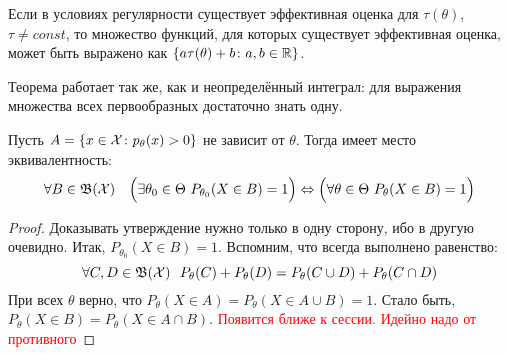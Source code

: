 \begin{theorem}
	Если в условиях регулярности существует эффективная оценка для $\tau(\theta)$, $\tau \neq const$, то множество функций, для которых существует эффективная оценка, может быть выражено как $\{a\tau(\theta) + b \colon a, b \in \mathbb{R}\}$.
\end{theorem}

\begin{anote}
	Теорема работает так же, как и неопределённый интеграл: для выражения множества всех первообразных достаточно знать одну.
\end{anote}

\begin{proposition}
	Пусть $A = \{x \in \mathcal{X} \colon p_\theta(x) > 0\}$ не зависит от $\theta$. Тогда имеет место эквивалентность:
	\[
		\forall B \in \mathfrak{B}(\mathcal{X})\quad \Big(\exists \theta_0 \in \Theta\ P_{\theta_0}(X \in B) = 1\Big) \Leftrightarrow \Big(\forall \theta \in \Theta\ P_\theta(X \in B) = 1\Big)
	\]
\end{proposition}

\begin{proof}
	Доказывать утверждение нужно только в одну сторону, ибо в другую очевидно. Итак, $P_{\theta_0}(X \in B) = 1$. Вспомним, что всегда выполнено равенство:
	\[
		\forall C, D \in \mathfrak{B}(\mathcal{X})\ \ P_\theta(C) + P_\theta(D) = P_\theta(C \cup D) + P_\theta(C \cap D)
	\]
	При всех $\theta$ верно, что $P_\theta(X \in A) = P_\theta(X \in A \cup B) = 1$. Стало быть, $P_\theta(X \in B) = P_\theta(X \in A \cap B)$.
	\textcolor{red}{Появится ближе к сессии. Идейно надо от противного}
\end{proof}

